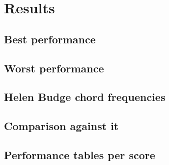 \chapter{Results}

\section{Best performance}
\section{Worst performance}
\section{Helen Budge chord frequencies}
\section{Comparison against it}
\section{Performance tables per score}

\newpage

